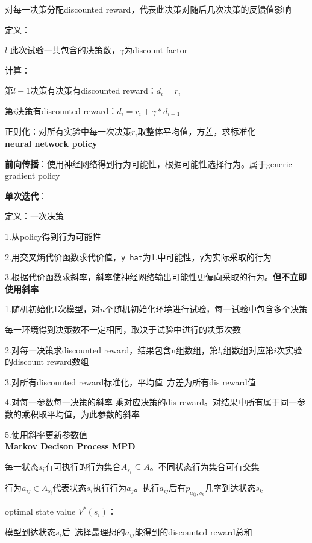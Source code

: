 \documentclass[UTF8]{ctexart}
\begin{document}
  对每一决策分配discounted reward，代表此决策对随后几次决策的反馈值影响

  定义：

  \quad $l$ 此次试验一共包含的决策数，$\gamma$为discount factor

  计算：

  \quad 第$l-1$决策有决策有discounted reward：$d_i = r_i$
  
  \quad 第$i$决策有discounted reward：$d_i = r_i + \gamma * d_{i+1}$
  
  \quad 正则化：对所有实验中每一次决策$r_i$取整体平均值，方差，求标准化\\
\textbf{neural network policy}

  \textbf{前向传播}：使用神经网络得到行为可能性，根据可能性选择行为。属于generic gradient policy

  \textbf{单次迭代}：

  \quad 定义：一次决策

  \quad \quad 1.从policy得到行为可能性

  \quad \quad 2.用交叉熵代价函数求代价值，\texttt{y\_hat}为1.中可能性，\texttt{y}为实际采取的行为

  \quad \quad 3.根据代价函数求斜率，斜率使神经网络输出可能性更偏向采取的行为。\textbf{但不立即使用斜率}

  \quad 1.随机初始化1次模型，对$n$个随机初始化环境进行试验，每一试验中包含多个决策
  
  \quad \quad 每一环境得到决策数不一定相同，取决于试验中进行的决策次数

  \quad 2.对每一决策求discounted reward，结果包含n组数组，第$l_i$组数组对应第$i$次实验的discount reward数组

  \quad 3.对所有discounted reward标准化，平均值\ 方差为所有dis reward值
  
  \quad 4.对每一参数每一决策的斜率 乘对应决策的dis reward。对结果中所有属于同一参数的乘积取平均值，为此参数的斜率

  \quad 5.使用斜率更新参数值\\
\textbf{Markov Decison Process MPD}

  每一状态$s_i$有可执行的行为集合$A_{s_i} \subseteq A$。不同状态行为集合可有交集

  行为$a_{ij} \in A_{s_i}$代表状态$s_i$执行行为$a_j$。执行$a_{ij}$后有$p_{a_{ij}, s_k}$几率到达状态$s_k$

  optimal state value $V^*(s_i)$：
  
  \quad 模型到达状态$s_i$后\ 选择最理想的$a_{ij}$能得到的discounted reward总和
\end{document}
